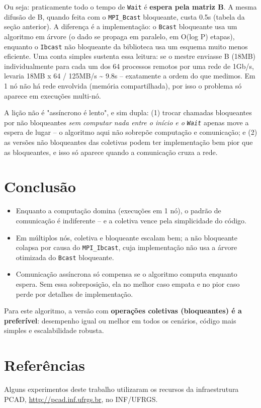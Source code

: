 Ou seja: praticamente todo o tempo de \texttt{Wait} é \textbf{espera
pela matriz B}. A mesma difusão de B, quando feita com o
\texttt{MPI\_Bcast} bloqueante, custa 0.5s (tabela da seção anterior). A
diferença é a implementação: o \texttt{Bcast} bloqueante usa um
algoritmo em árvore (o dado se propaga em paralelo, em O(log P) etapas),
enquanto o \texttt{Ibcast} não bloqueante da biblioteca usa um esquema
muito menos eficiente. Uma conta simples sustenta essa leitura: se o
mestre enviasse B (18MB) individualmente para cada um dos 64 processos
remotos por uma rede de 1Gb/s, levaria 18MB x 64 / 125MB/s
\textasciitilde{} 9.8s -- exatamente a ordem do que medimos. Em 1 nó não
há rede envolvida (memória compartilhada), por isso o problema só
aparece em execuções multi-nó.

A lição não é "assíncrono é lento", e sim dupla: (1) trocar chamadas
bloqueantes por não bloqueantes \emph{sem computar nada entre o início e
o} \emph{\texttt{Wait}} apenas move a espera de lugar -- o algoritmo
aqui não sobrepõe computação e comunicação; e (2) as versões não
bloqueantes das coletivas podem ter implementação bem pior que as
bloqueantes, e isso só aparece quando a comunicação cruza a rede.

\section{Conclusão}\label{conclusuxe3o}

\begin{itemize}
\tightlist
\item
  Enquanto a computação domina (execuções em 1 nó), o padrão de
  comunicação é indiferente -- e a coletiva vence pela simplicidade do
  código.
\item
  Em múltiplos nós, coletiva e bloqueante escalam bem; a não bloqueante
  colapsa por causa do \texttt{MPI\_Ibcast}, cuja implementação não usa
  a árvore otimizada do \texttt{Bcast} bloqueante.
\item
  Comunicação assíncrona só compensa se o algoritmo computa enquanto
  espera. Sem essa sobreposição, ela no melhor caso empata e no pior
  caso perde por detalhes de implementação.
\end{itemize}

Para este algoritmo, a versão com \textbf{operações coletivas
(bloqueantes) é a preferível}: desempenho igual ou melhor em todos os
cenários, código mais simples e escalabilidade robusta.

\section{Referências}\label{referuxeancias}

Alguns experimentos deste trabalho utilizaram os recursos da
infraestrutura PCAD, \url{http://pcad.inf.ufrgs.br}, no INF/UFRGS.
